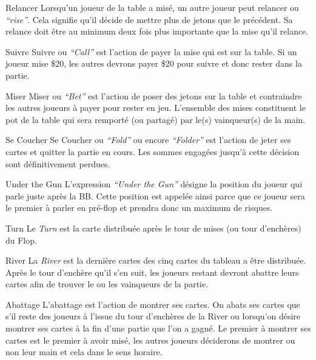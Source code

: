 \begin{df}{Relancer}
	Lorsqu'un joueur de la table a misé, un autre joueur peut relancer ou \textit{``rise''}. Cela signifie qu'il décide de mettre plus de jetons que le précédent. Sa relance doit être au minimum deux fois plus importante que la mise qu'il relance.
\end{df}

\begin{df}{Suivre}
	Suivre ou \textit{``Call''} est l'action de payer la mise qui est sur la table. Si un joueur mise \$20, les autres devrons payer \$20 pour suivre et donc rester dans la partie.
\end{df}

\begin{df}{Miser}
	Miser ou \textit{``Bet''} est l'action de poser des jetons sur la table et contraindre les autres joueurs à payer pour rester en jeu. L'ensemble des mises constituent le pot de la table qui sera remporté (ou partagé) par le(s) vainqueur(s) de la main.
\end{df}

\begin{df}{Se Coucher}
	Se Coucher ou \textit{``Fold''} ou encore \textit{``Folder''} est l'action de jeter ses cartes et quitter la partie en cours. Les sommes engagées jusqu'à cette décision sont définitivement perdues.
\end{df}

\begin{df}{Under the Gun}
	L'expression \textit{``Under the Gun''} désigne la position du joueur qui parle juste après la BB. Cette position est appelée ainsi parce que ce joueur sera le premier à parler en pré-flop et prendra donc un maximum de risques.
\end{df}

\begin{df}{Turn}
	Le \textit{Turn} est la carte distribuée après le tour de mises (ou tour d'enchères) du Flop.
\end{df}

\begin{df}{River}
	La \textit{River} est la dernière cartes des cinq cartes du tableau a être distribuée. Après le tour d'enchère qu'il s'en suit, les joueurs restant devront abattre leurs cartes afin de trouver le ou les vainqueurs de la partie.
\end{df}

\begin{df}{Abattage}
	L'abattage est l'action de montrer ses cartes. On abats ses cartes que s'il reste des joueurs à l'issue du tour d'enchères de la River ou lorsqu'on désire montrer ses cartes à la fin d'une partie que l'on a gagné. Le premier à montrer ses cartes est le premier à avoir misé, les autres joueurs déciderons de montrer ou non leur main et cela dans le sens horaire.
\end{df}

